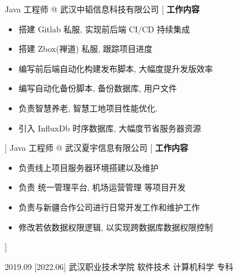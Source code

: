 \documentclass[zh]{resume}
\begin{document}
\begin{experiences}
  {Java 工程师 @ {\color{accentcolor} 武汉中韬信息科技有限公司} }%
	[
    {\textbf{工作内容}}
      \begin{itemize}
        \item 搭建 Gitlab 私服, 实现前后端 CI/CD 持续集成
        \item 搭建 Zbox(禅道) 私服, 跟踪项目进度
        \item 编写前后端自动化构建发布脚本, 大幅度提升发版效率
        \item 编写自动化备份脚本, 备份数据库, 用户文件
        \item 负责智慧养老, 智慧工地项目性能优化.
        \item 引入 InfluxDb 时序数据库, 大幅度节省服务器资源
      \end{itemize}
  ]
	\separator{0.5ex}
  {Java 工程师 @ {\color{accentcolor} 武汉夏宇信息有限公司} }%
	[
    {\textbf{工作内容}}
      \begin{itemize}
        \item 负责线上项目服务器环境搭建以及维护
        \item 负责 统一管理平台, 机场运营管理 等项目开发
        \item 负责与新疆合作公司进行日常开发工作和维护工作
        \item 修改若依数据权限逻辑, 以实现跨数据库数据权限控制
      \end{itemize}
  ]

\end{experiences}

\begin{educations}
	\education%
	{2019.09}%
	[2022.06]%
	{武汉职业技术学院}%
	{软件技术}%
	{计算机科学}%
	{专科}
\end{educations}

\newpage
{}
\end{document}
